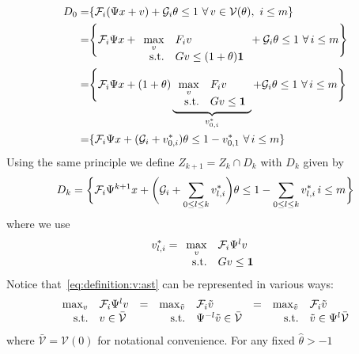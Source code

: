 \documentclass[letterpaper, 10pt, conference]{ieeeconf} %
\begin{document}
\begin{equation}\small
\begin{split}
	D_0 =& \{\mathcal F_i(\Psi x+v) + \mathcal G_i\theta \leq 1 \ \forall\, v\in\mathcal V(\theta), \ i\leq m\}\\
	=&\Biggl\{\mathcal F_i\Psi x + \begin{array}[t]{rl}\displaystyle\max_v& F_i v \\ \text{s.t.}& Gv \leq 
	(1+\theta){\bf{1}} \end{array}
	 + \mathcal G_i \theta \leq 1 \ \forall\, i\leq m\Biggr\}\\
	=&\Biggl\{\mathcal F_i\Psi x + (1+\theta)\underbrace{\begin{array}[t]{rl}\displaystyle\max_v& F_i v \\ 
	\text{s.t.}& Gv \leq {\bf{1}}\end{array}}_{v_{0,i}^\ast}
	 + \mathcal G_i \theta \leq 1 \ \forall\, i\leq m\Biggr\}\\
	=&\{\mathcal F_i\Psi x + (\mathcal G_i + v_{0,i}^\ast)\theta \leq 1 - v_{0,1}^\ast \ \forall \, i\leq m
	\}
\end{split}\end{equation}
%
Using the same principle we define $Z_{k+1}=Z_k\cap D_k$ with $D_k$ given by
%
\begin{equation}\label{eq:parametrised:Dk}\small
	D_k = \biggl\{\mathcal F_i\Psi^{k+1}x+ \biggl(\mathcal G_i +\sum_{0\leq l\leq k} v_{l,i}^\ast\biggr)\theta \leq 1 
	- \sum_{0\leq l\leq k} v_{l,i}^\ast\, i\leq m\biggr\}
\end{equation}
%
where we use 
%
\begin{equation}\label{eq:definition:v:ast}
v_{l,i}^\ast = \begin{array}[t]{rl}\displaystyle\max_v & \mathcal F_i \Psi^{l} v \\ \text{s.t.}& Gv\leq{\bf{1}}
\end{array}
\end{equation}
%
Notice that~\eqref{eq:definition:v:ast} can be represented in various ways:
%
\[
\small
\begin{array}{rlcrlcrl}
\max_v&\mathcal F_i \Psi^l v &=& \max_{\tilde v}&\mathcal F_i \tilde  v &=& \max_{\tilde v}&\mathcal F_i \tilde v \\ 
\text{s.t.}&v\in\bar{\mathcal{V}} & & \text{s.t.}&\Psi^{-l} \tilde v\in\bar{\mathcal{V}} & &
\text{s.t.}& \tilde v\in\Psi^l\bar{\mathcal{V}}
\end{array}
\]
%
where $\bar{\mathcal{V}}=\mathcal V(0)$ for notational convenience. For any fixed $\hat\theta>-1$
\end{document}
